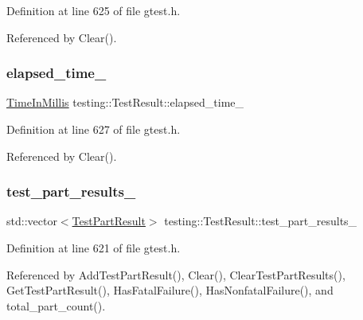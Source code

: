 Definition at line 625 of file gtest.\+h.



Referenced by Clear().

\mbox{\label{classtesting_1_1TestResult_a739a8ca54db4be004ba748b11e82b056}} 
\subsubsection{\texorpdfstring{elapsed\+\_\+time\+\_\+}{elapsed\_time\_}}
{\footnotesize\ttfamily \hyperlink{namespacetesting_a992de1d091ce660f451d1e8b3ce30fd6}{Time\+In\+Millis} testing\+::\+Test\+Result\+::elapsed\+\_\+time\+\_\+\hspace{0.3cm}{\ttfamily [private]}}



Definition at line 627 of file gtest.\+h.



Referenced by Clear().

\mbox{\label{classtesting_1_1TestResult_af17c00fae1435d344b318eb6bbb56cff}} 
\subsubsection{\texorpdfstring{test\+\_\+part\+\_\+results\+\_\+}{test\_part\_results\_}}
{\footnotesize\ttfamily std\+::vector$<$\hyperlink{classtesting_1_1TestPartResult}{Test\+Part\+Result}$>$ testing\+::\+Test\+Result\+::test\+\_\+part\+\_\+results\+\_\+\hspace{0.3cm}{\ttfamily [private]}}



Definition at line 621 of file gtest.\+h.



Referenced by Add\+Test\+Part\+Result(), Clear(), Clear\+Test\+Part\+Results(), Get\+Test\+Part\+Result(), Has\+Fatal\+Failure(), Has\+Nonfatal\+Failure(), and total\+\_\+part\+\_\+count().

